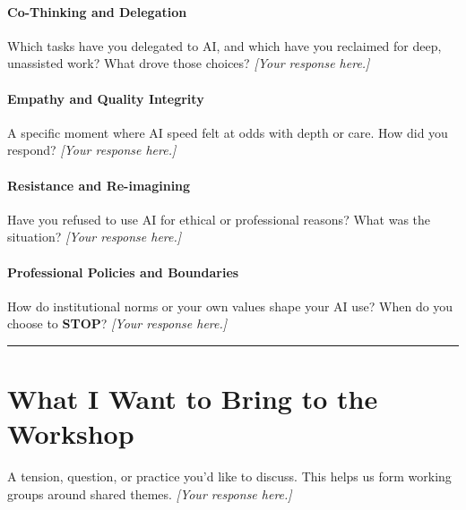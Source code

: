 \documentclass[sigconf]{acmart}
\newcommand{\sectionrule}{\vspace{0.3em}\noindent\textcolor{workshopaccent}{\rule{\linewidth}{0.4pt}}\vspace{0.3em}}
\newcommand{\prompt}[1]{\vspace{0.5em}\noindent\textcolor{workshopaccent}{\small\sffamily #1}\vspace{0.3em}}
\newcommand{\response}{\vspace{0.3em}\noindent\textit{[Your response here.]}\vspace{0.5em}}
\newcommand{\phaseicon}[1]{\textcolor{workshopaccent}{#1}\enspace}
\begin{document}
\paragraph{\phaseicon{\faHandshake} Co-Thinking and Delegation}
Which tasks have you delegated to AI, and which have you reclaimed
for deep, unassisted work? What drove those choices?
\response

\paragraph{\phaseicon{\faHeart} Empathy and Quality Integrity}
A specific moment where AI speed felt at odds with depth or care.
How did you respond?
\response

\paragraph{\phaseicon{\faFistRaised} Resistance and Re-imagining}
Have you refused to use AI for ethical or professional reasons?
What was the situation?
\response

\paragraph{\phaseicon{\faBalanceScale} Professional Policies and Boundaries}
How do institutional norms or your own values shape your AI use?
When do you choose to \textbf{STOP}?
\response

\sectionrule

\section*{What I Want to Bring to the Workshop}

\prompt{A tension, question, or practice you'd like to discuss.
This helps us form working groups around shared themes.}
\response


% 
\end{document}
